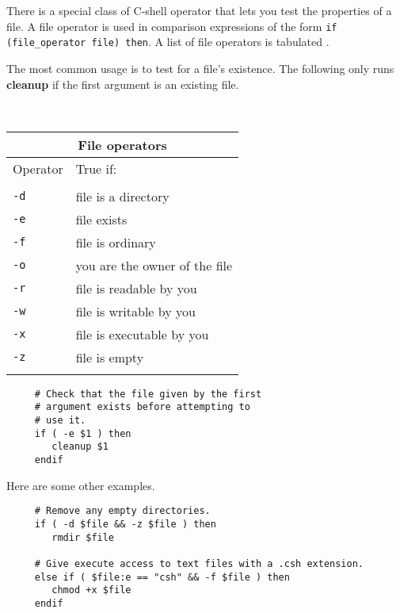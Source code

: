 \begin{minipage}{62mm}
There is a special class of C-shell operator that lets you test the
properties of a file.  A {\sf file operator} is used in comparison
expressions of the form \mbox{\tt if (file\_operator file) then}.
A list of file operators is tabulated .
\medskip

The most common usage is to test for a file's existence.  The following
only runs {\bf cleanup} if the first argument is an existing file.

\vspace*{9mm}
\end{minipage}
\ \hfill \
\begin{minipage}{74mm}
\vspace*{-16mm}
\begin{tabular}{ll}
\hline
\multicolumn{2}{c}{File operators} \\ \hline
Operator & True if: \\ \hline
\\
{\tt -d} & file is a directory \\
{\tt -e} & file exists \\
{\tt -f} & file is ordinary \\
{\tt -o} & you are the owner of the file \\
{\tt -r} & file is readable by you \\
{\tt -w} & file is writable by you \\
{\tt -x} & file is executable by you \\
{\tt -z} & file is empty \\
\\ \hline
\end{tabular}
\end{minipage}
\vspace*{-8mm}

\small
\begin{verbatim}
     # Check that the file given by the first
     # argument exists before attempting to
     # use it.
     if ( -e $1 ) then
        cleanup $1
     endif
\end{verbatim}
\normalsize

Here are some other examples.

\small
\begin{verbatim}
     # Remove any empty directories.
     if ( -d $file && -z $file ) then
        rmdir $file

     # Give execute access to text files with a .csh extension.
     else if ( $file:e == "csh" && -f $file ) then
        chmod +x $file
     endif
\end{verbatim}

